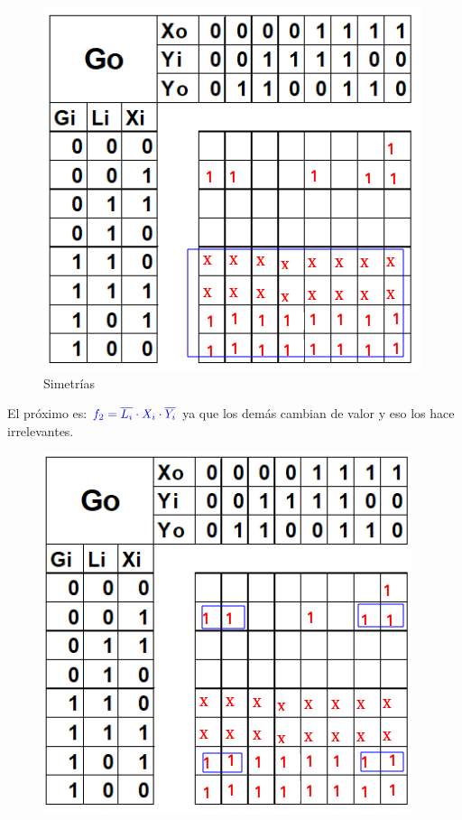 \documentclass[12pt,letterpaper]{book}
\begin{document}
\begin{multicols}{2}
\begin{figure}[H]
\centering
\includegraphics[width=1\linewidth]{figures/k2.png}
\caption{Simetrías}
\label{k2}
\end{figure}
\vspace{0.2cm}

El próximo es: $\textcolor{blue}{f_2=\overline{L_i} \cdot X_i \cdot \overline{Y_i}}$ ya que los demás cambian de valor y eso los hace irrelevantes. 

\begin{figure}[H]
\centering
\includegraphics[width=1\linewidth]{figures/k3.png}
\caption{}
\label{}
\end{figure}
\vspace{0.2cm}


\end{multicols}
\end{document}
